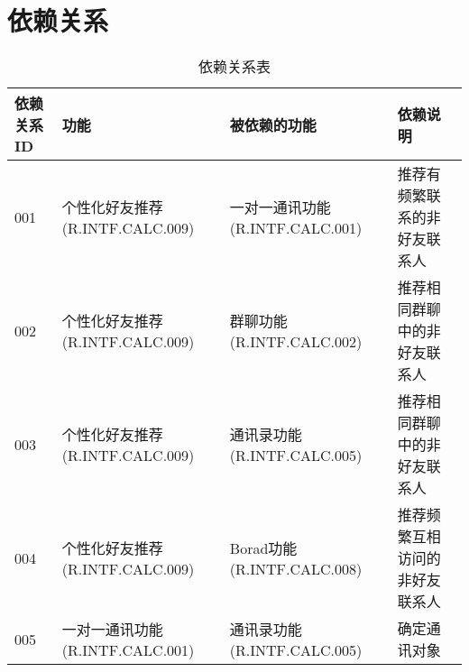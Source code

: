 \chapter{\color{red}依赖关系}
\begin{table}[htbp]
    \centering
    \caption{\color{red}依赖关系表} \label{tab:classification}
    \begin{tabular}{|p{6em}|p{9em}|p{9em}|p{7em}|}
            \hline%
            依赖关系ID  & 功能                                     & 被依赖的功能                              & 依赖说明 \\
            \hline%
            001        & 个性化好友推荐(R.INTF.CALC.009)           & 一对一通讯功能(R.INTF.CALC.001)            & 推荐有频繁联系的非好友联系人\\
            \hline%
            002        & 个性化好友推荐(R.INTF.CALC.009)           & 群聊功能(R.INTF.CALC.002)                 & 推荐相同群聊中的非好友联系人\\
            \hline%
            003        & 个性化好友推荐(R.INTF.CALC.009)           & 通讯录功能(R.INTF.CALC.005)               & 推荐相同群聊中的非好友联系人\\
            \hline%
            004        & 个性化好友推荐(R.INTF.CALC.009)           & Borad功能(R.INTF.CALC.008)               & 推荐频繁互相访问的非好友联系人\\
            \hline%
            005        & 一对一通讯功能(R.INTF.CALC.001)           & 通讯录功能(R.INTF.CALC.005)               & 确定通讯对象\\

\end{tabular}
\end{table}

